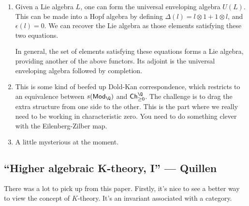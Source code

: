 \documentclass[11pt]{article}
\newcommand{\KanSemResponse}[1]
{
\thispagestyle{fancy}
\section{#1}
}
\begin{document}
\begin{Jeremy RationalHomotopyPractice}
\begin{enumerate}
In general, taking the grouplike elements of a cocommutative Hopf algebra returns a group (the antipode provides the inverse of a grouplike element), providing a functor $\scrG:\mathsf{CHA}\to\mathsf{Gp}$.

\INDENT The adjoint functor in the other direction is the group algebra functor followed by completion at the augmentation ideal.
\item Given a Lie algebra $L$, one can form the universal enveloping algebra $U(L)$. This can be made into a Hopf algebra by defining $\Delta(l)=l\otimes1+1\otimes l$, and $\epsilon(l)=0$. We can recover the Lie algebra as those elements satisfying these two equations.

\INDENT In general, the set of elements satisfying these equations forms a Lie algebra, providing another of the above functors. Its adjoint is the universal enveloping algebra followed by completion.
\item This is some kind of beefed up Dold-Kan correspondence, which restricts to an equivalence between $s(\mathsf{Mod}_\Q)$ and $\mathsf{Ch}^{\Q}_{\geq0}$. The challenge is to drag the extra structure from one side to the other. This is the part where we really need to be working in characteristic zero. You need to do something clever with the Eilenberg-Zilber map.
\item A little mysterious at the moment.
\end{enumerate}

\pagebreak
\end{Jeremy RationalHomotopyPractice}
\begin{KTheoryQuillen}
\KanSemResponse
{``Higher algebraic K-theory, I'' --- Quillen}
There was a lot to pick up from this paper. Firstly, it's nice to see a better way to view the concept of $K$-theory. It's an invariant associated with a category.

\pagebreak
\end{KTheoryQuillen}
\end{document}
